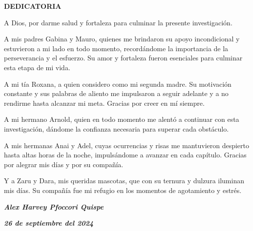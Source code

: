 \thispagestyle{plain}
\newpage

\begin{center}
  \textbf{DEDICATORIA}
\end{center}

\vspace{1cm}

A Dios, por darme salud y fortaleza para culminar la presente investigación.

A mis padres Gabina y Mauro, quienes me brindaron su apoyo incondicional y estuvieron a mi lado en todo momento, recordándome la importancia de la perseverancia y el esfuerzo. Su amor y fortaleza fueron esenciales para culminar esta etapa de mi vida.

A mi tía Roxana, a quien considero como mi segunda madre. Su motivación constante y sus palabras de aliento me impulsaron a seguir adelante y a no rendirme hasta alcanzar mi meta. Gracias por creer en mí siempre.

A mi hermano Arnold, quien en todo momento me alentó a continuar con esta investigación, dándome la confianza necesaria para superar cada obstáculo.

A mis hermanas Anai y Adel, cuyas ocurrencias y risas me mantuvieron despierto hasta altas horas de la noche, impulsándome a avanzar en cada capítulo. Gracias por alegrar mis días y por su compañía.

Y a Zaru y Dara, mis queridas mascotas, que con su ternura y dulzura iluminan mis días. Su compañía fue mi refugio en los momentos de agotamiento y estrés.

\vspace{2cm}

\begin{flushright}
  \textbf{\textit{Alex Harvey Pfoccori Quispe}}

  \textbf{\textit{26 de septiembre del 2024}}
\end{flushright}

\newpage